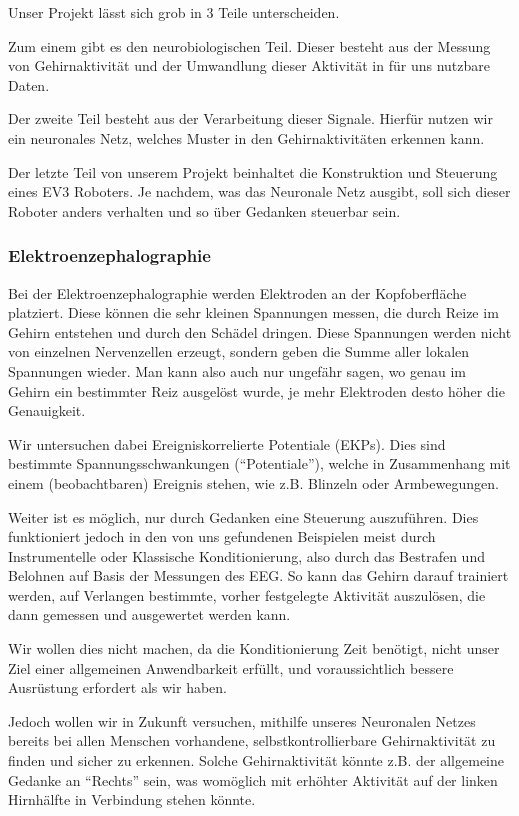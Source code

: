 \documentclass{scrartcl}
\begin{document}
	Unser Projekt lässt sich grob in 3 Teile unterscheiden. 

	Zum einem gibt es den neurobiologischen Teil. Dieser besteht aus der Messung von Gehirnaktivität und der Umwandlung dieser Aktivität in für uns nutzbare Daten. 

	Der zweite Teil besteht aus der Verarbeitung dieser Signale. Hierfür nutzen wir ein neuronales Netz, welches Muster in den Gehirnaktivitäten erkennen kann. 

	Der letzte Teil von unserem Projekt beinhaltet die Konstruktion und Steuerung eines EV3 Roboters. Je nachdem, was das Neuronale Netz ausgibt, soll sich dieser Roboter anders verhalten und so über Gedanken steuerbar sein. 


	\subsubsection{Elektroenzephalographie}

	Bei der Elektroenzephalographie werden Elektroden an der Kopfoberfläche platziert. Diese können die sehr kleinen Spannungen messen, die durch Reize im Gehirn entstehen und durch den Schädel dringen. Diese Spannungen werden nicht von einzelnen Nervenzellen erzeugt, sondern geben die Summe aller lokalen Spannungen wieder. Man kann also auch nur ungefähr sagen, wo genau im Gehirn ein bestimmter Reiz ausgelöst wurde, je mehr Elektroden desto höher die Genauigkeit.

	Wir untersuchen dabei Ereigniskorrelierte Potentiale (EKPs). Dies sind bestimmte Spannungsschwankungen (\enquote{Potentiale}), welche in Zusammenhang mit einem (beobachtbaren) Ereignis stehen, wie z.B. Blinzeln oder Armbewegungen. 
	
	Weiter ist es möglich, nur durch Gedanken eine Steuerung auszuführen. Dies funktioniert jedoch in den von uns gefundenen Beispielen meist durch Instrumentelle oder Klassische Konditionierung, also durch das Bestrafen und Belohnen auf Basis der Messungen des EEG. So kann das Gehirn darauf trainiert werden, auf Verlangen bestimmte, vorher festgelegte Aktivität auszulösen, die dann gemessen und ausgewertet werden kann. 
	
	Wir wollen dies nicht machen, da die Konditionierung Zeit benötigt, nicht unser Ziel einer allgemeinen Anwendbarkeit erfüllt, und voraussichtlich bessere Ausrüstung erfordert als wir haben. 
	
	Jedoch wollen wir in Zukunft versuchen, mithilfe unseres Neuronalen Netzes bereits bei allen Menschen vorhandene, selbstkontrollierbare Gehirnaktivität zu finden und sicher zu erkennen. Solche Gehirnaktivität könnte z.B. der allgemeine Gedanke an “Rechts” sein, was womöglich mit erhöhter Aktivität auf der linken Hirnhälfte in Verbindung stehen könnte. 
	
\end{document}
